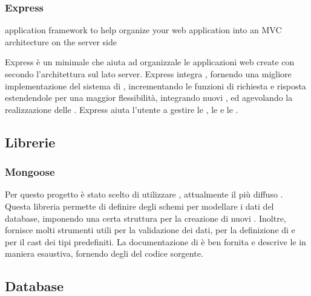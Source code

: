 \documentclass[12pt,a4paper]{article}
\begin{document}
\subsubsection{Express}\label{express}
application framework to help organize your web application into an MVC architecture on the server side

Express è un  minimale che aiuta ad organizzale le applicazioni web create con  secondo l'architettura  sul lato server. Express integra , fornendo una migliore implementazione del sistema di , incrementando le funzioni di richiesta e risposta estendendole per una maggior flessibilità, integrando nuovi , ed agevolando la realizzazione delle .
Express aiuta l'utente a gestire le , le  e le .


\subsection{Librerie}\label{librery}
\subsubsection{Mongoose}\label{mongoose}
Per questo progetto è stato scelto di utilizzare , attualmente il più diffuso . Questa libreria permette di definire degli schemi per modellare i dati del database, imponendo una certa struttura per la creazione di nuovi . Inoltre, fornisce molti strumenti utili per la validazione dei dati, per la definizione di  e per il cast dei tipi predefiniti.
La documentazione di  è ben fornita e descrive le  in maniera esaustiva, fornendo degli  del codice sorgente.


\subsection{Database}
\end{document}
